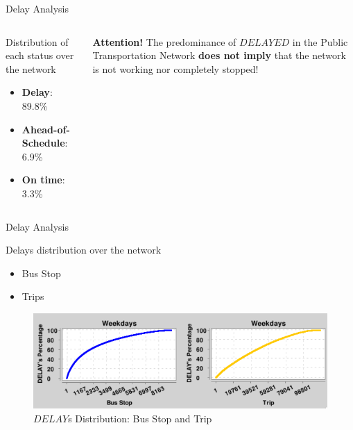 \documentclass[xcolor=dvipsnames,table]{beamer}
\begin{document}
\begin{frame}{Delay Analysis}
        \begin{columns}
                \begin{block}{Distribution of each status over the network}
                        \begin{itemize}
                                \item \textbf{Delay}: 89.8\% 
                                \item \textbf{Ahead-of-Schedule}: 6.9\% 
                                \item \textbf{On time}: 3.3\%
                        \end{itemize}
                \end{block}
                \centering
                \begin{block}{\textbf{Attention!}}
                        The predominance of $DELAYED$ in the Public Transportation Network \textbf{does not imply} that the network is not working
nor completely stopped!
                \end{block}
        \end{columns}
\end{frame}
\begin{frame}{Delay Analysis}
                \begin{block}{Delays distribution over the network}
                        \begin{itemize}
                                \item Bus Stop
                                \item Trips
                        \end{itemize}
                \end{block}
        \begin{figure}[H]
                \centering
                \includegraphics[width=\textwidth]{images/delays_distribution.png}
                \caption{$DELAY$s Distribution: Bus Stop and Trip}
        \end{figure}
\end{frame}
\end{document}
